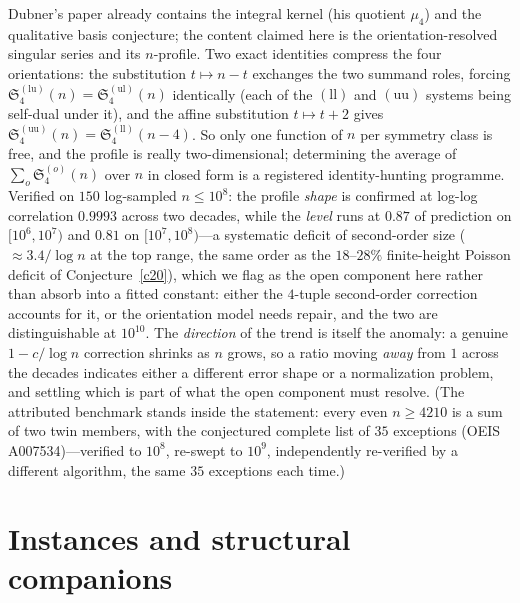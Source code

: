 \documentclass[11pt]{article}
\theoremstyle{definition}
\newcommand{\SG}{\mathfrak S}
\begin{document}
Dubner's paper already contains the integral kernel (his quotient
$\mu_4$) and the qualitative basis conjecture; the content claimed here is
the orientation-resolved singular series and its
$n$-profile.  Two exact identities compress the four orientations: the
substitution $t\mapsto n-t$ exchanges the two
summand roles, forcing
$\SG_4^{(\mathrm{lu})}(n)=\SG_4^{(\mathrm{ul})}(n)$ identically
(each of the $(\mathrm{ll})$ and $(\mathrm{uu})$ systems being
self-dual under it), and the affine substitution $t\mapsto t+2$
gives $\SG_4^{(\mathrm{uu})}(n)=\SG_4^{(\mathrm{ll})}(n-4)$.  So
only one function of $n$ per symmetry class is free, and the profile
is really two-dimensional; determining the average of
$\sum_o\SG_4^{(o)}(n)$ over $n$ in closed form is a
registered identity-hunting programme.  Verified on $150$ log-sampled
$n\le10^8$: the profile
\emph{shape} is confirmed at log-log correlation $0.9993$ across two
decades, while the \emph{level} runs at $0.87$ of prediction on
$[10^6,10^7)$ and $0.81$ on $[10^7,10^8)$---a systematic deficit of
second-order size (${\approx}3.4/\log n$ at the top range,
the same order as the $18$--$28\%$ finite-height Poisson deficit of
Conjecture~\ref{c20}), which we flag as the open component here
rather than absorb into a fitted constant: either the $4$-tuple
second-order correction accounts for it, or the orientation model
needs repair, and the two are distinguishable at $10^{10}$.  The
\emph{direction} of the trend is itself the anomaly: a genuine
$1-c/\log n$ correction shrinks as $n$ grows, so a ratio moving
\emph{away} from $1$ across the decades indicates either a different
error shape or a normalization problem, and settling which is part
of what the open component must resolve.  (The
attributed benchmark stands inside the statement: every even
$n\ge4210$ is a sum of two twin members, with the conjectured
complete list of $35$ exceptions (OEIS A007534)---verified to $10^8$,
re-swept to $10^9$, independently
re-verified by a different algorithm, the same
$35$ exceptions each time.)

\section{Instances and structural companions}
\end{document}
